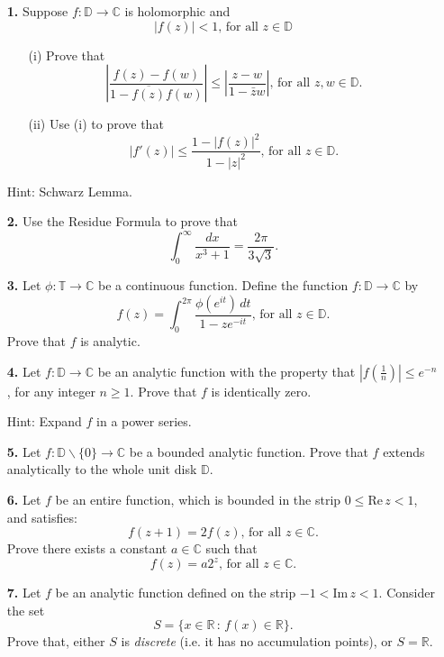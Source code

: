 \documentclass[12pt]{article}
\begin{document}
\begin{itemize}
\item[{\bf 1.}] Suppose $f:\mathbb{D}\to\mathbb{C}$ is holomorphic and
$$|f(z)|<1\text{, for all }z\in\mathbb{D}$$
\begin{itemize}
\item[(i)] Prove that
$$\left|\frac{f(z)-f(w)}{1-\overline{f(z)}f(w)}\right|\leq\left|\frac{z-w}{1-\bar{z}w}\right|
\text{, for all }z,w\in\mathbb{D}.$$
\item[(ii)] Use (i) to prove that
$$\left|f'(z)\right|\leq\frac{1-|f(z)|^2}{1-|z|^2}\text{, for all }z\in\mathbb{D}.$$
\end{itemize}
{\sc Hint}: Schwarz Lemma.


\item[{\bf 2.}] Use the Residue Formula to prove that
$$
\int_0^\infty\frac{dx}{x^3+1}=\frac{2\pi}{3\sqrt{3}}.$$


\item[{\bf 3.}] Let $\phi:\mathbb{T}\to\mathbb{C}$ be a continuous function.
Define the function $f:\mathbb{D}\to\mathbb{C}$ by
$$f(z)=\int_0^{2\pi}\frac{\phi(e^{it})\,dt}{1-ze^{-it}}\text{, for all }
z\in\mathbb{D}.$$
Prove that $f$ is analytic.


\item[{\bf 4.}] Let $f:\mathbb{D}\to\mathbb{C}$ be an analytic function with the
property that $\left|f(\frac 1n)\right|\leq e^{-n}$, for any integer $n\geq 1$.
Prove that $f$ is identically zero.

{\sc Hint:} Expand $f$ in a power series.


\item[{\bf 5.}] Let $f:\mathbb{D}\smallsetminus\{0\}\to\mathbb{C}$ be a bounded analytic function.
Prove that $f$ extends analytically to the whole unit disk $\mathbb{D}$.


\item[{\bf 6.}] Let $f$ be an entire function, which is bounded in the strip
$0\leq\text{Re}\,z <1$, and satisfies:
$$f(z+1)=2f(z)\text{, for all }z\in\mathbb{C}.$$
Prove there exists a constant $a\in\mathbb{C}$ such that
$$f(z)=a2^z\text{, for all }z\in\mathbb{C}.$$


\item[{\bf 7.}] Let $f$ be an analytic function defined on the strip
$-1<\text{Im}\,z<1$. Consider the set
$$
S=\{x\in\mathbb{R}\,:\,f(x)\in\mathbb{R}\}.$$
Prove that, either $S$ is {\em discrete\/} (i.e. it has no accumulation points),
or $S=\mathbb{R}$.


\end{itemize}
\end{document}

